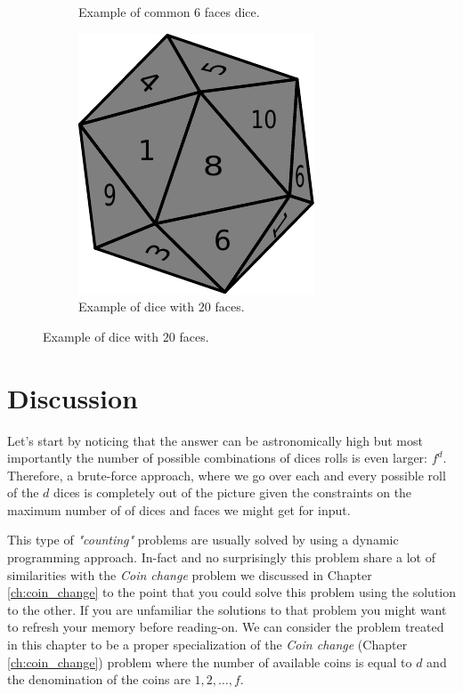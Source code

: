 \begin{figure}
\begin{subfigure}[t]{0.25\textwidth}
		\caption{Example of common $6$ faces dice.}
		\label{fig:cycle_in_list:6faces_dice}
	 \end{subfigure}
	 \hfill
	 \begin{subfigure}[t]{0.25\textwidth}
		 \includegraphics[width=1\linewidth]{sources/dice_rolls/images/icosahedron_dice}
		 \caption{Example of dice with $20$ faces.}
		 \label{fig:cycle_in_list:20faces_dice}
	  \end{subfigure}
\end{figure}

\section{Discussion}
\label{dice_rolls:sec:discussion}
Let's start by noticing that the answer can be astronomically high but most importantly the number of possible combinations of dices rolls is even larger: $f^d$. 
Therefore, a  brute-force approach, where we go over each and every possible roll of the $d$ dices is completely out of the picture given the constraints on the maximum number of 
of dices and faces we might get for input.

This type of \textit{"counting"} problems are usually solved by using a dynamic programming approach. In-fact and 
no surprisingly this problem share a lot of similarities with the \textit{Coin change} problem we discussed in Chapter \ref{ch:coin_change}
to the point that you could solve this problem using the solution to the other. If you are unfamiliar the solutions to that problem you might want to refresh your memory
before reading-on. 
We can consider the problem treated in this chapter to be a proper specialization of the \textit{Coin change} (Chapter \ref{ch:coin_change}) 
problem where the number of available coins is equal to $d$ and the denomination of the coins are $1,2,\ldots,f$.


